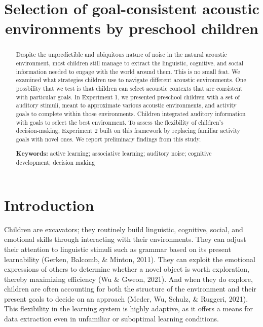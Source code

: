 \documentclass[10pt, letterpaper]{article}
\title{Selection of goal-consistent acoustic environments by preschool
children}
\begin{document}
\maketitle

\begin{abstract}
Despite the unpredictible and ubiquitous nature of noise in the natural
acoustic environment, most children still manage to extract the
linguistic, cognitive, and social information needed to engage with the
world around them. This is no small feat. We examined what strategies
children use to navigate different acoustic environments. One possbility
that we test is that children can select acoustic contexts that are
consistent with particular goals. In Experiment 1, we presented
preschool children with a set of auditory stimuli, meant to approximate
various acoustic environments, and activity goals to complete within
those environments. Children integrated auditory information with goals
to select the best environment. To assess the flexibility of children's
decision-making, Experiment 2 built on this framework by replacing
familiar activity goals with novel ones. We report preliminary findings
from this study.

\textbf{Keywords:}
active learning; associative learning; auditory noise; cognitive
development; decision making
\end{abstract}

\hypertarget{introduction}{%
\section{Introduction}\label{introduction}}

Children are excavators; they routinely build linguistic, cognitive,
social, and emotional skills through interacting with their
environments. They can adjust their attention to linguistic stimuli such
as grammar based on its present learnability (Gerken, Balcomb, \&
Minton, 2011). They can exploit the emotional expressions of others to
determine whether a novel object is worth exploration, thereby
maximizing efficiency (Wu \& Gweon, 2021). And when they do explore,
children are often accounting for both the structure of the environment
and their present goals to decide on an approach (Meder, Wu, Schulz, \&
Ruggeri, 2021). This flexibility in the learning system is highly
adaptive, as it offers a means for data extraction even in unfamiliar or
suboptimal learning conditions.
\end{document}

